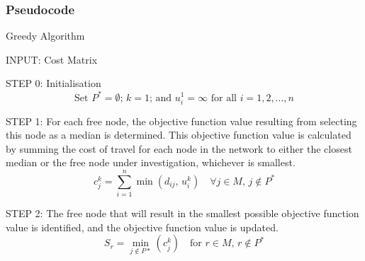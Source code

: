 \documentclass[11pt]{article}
\newcommand{\np}{\newpage}
\begin{document}
	\subsubsection{Pseudocode}
	\begin{algorithm}
		\caption{Greedy Algorithm}
		\begin{algorithmic}[0]
			
			\Statex 
			\Statex INPUT: Cost Matrix
			
			\Statex
			\Statex STEP 0: Initialisation	
			\begin{equation*}
			\text{Set } P^{*} = \emptyset \text{; } k = 1\text{; and }u_i^1 = \infty\text{ for all } i=1,2,\dots,n
			\end{equation*}
			
			\Statex 
			\Statex STEP 1: For each free node, the objective function value resulting from selecting this node as a median is determined.  This objective function value is calculated by summing the cost of travel for each node in the network to either the closest median or the free node under investigation, whichever is smallest.
			\begin{equation*}
			c_j^k = \sum_{i=1}^{n}\min(d_{ij} \text{, } u_i^k) \quad \forall j \in M \text{, } j \notin P^*
			\end{equation*}
			
			\Statex 
			\Statex STEP 2: The free node that will result in the smallest possible objective function value is identified, and the objective function value is updated.
			\begin{equation*}
			S_r = \min_{j \notin P*}(c_j^k) \quad \text{for } r \in M \text{, } r \notin P^*
			\end{equation*}

		\end{algorithmic}
	\end{algorithm}
\np	
\end{document}
